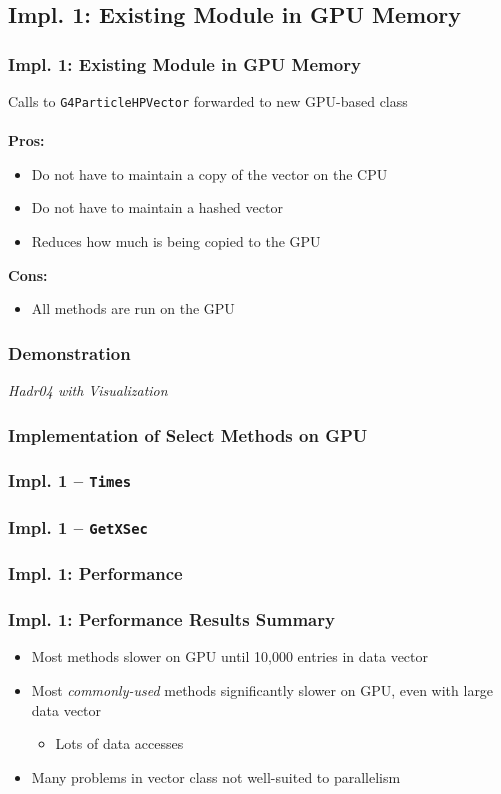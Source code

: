 \documentclass{beamer}
\newcommand{\textapprox}{\raisebox{0.5ex}{\texttildelow}}
\newcommand\pro{\item[$+$]}
\newcommand\con{\item[$-$]}
\begin{document}
\subsection{Impl. 1: Existing Module in GPU Memory}
\begin{frame}
\frametitle{Impl. 1: Existing Module in GPU Memory}
Calls to \texttt{G4ParticleHPVector} forwarded to new GPU-based class\\~\\ %

\textbf{Pros:}
\begin{itemize}
\pro Do not have to maintain a copy of the vector on the CPU
\pro Do not have to maintain a hashed vector
\pro Reduces how much is being copied to the GPU
\end{itemize}
\textbf{Cons:}
\begin{itemize}
\con All methods are run on the GPU
\end{itemize}
\end{frame}

\begin{frame}
\frametitle{Demonstration}
\begin{center}
\emph{Hadr04 with Visualization}
\end{center}
\end{frame}

\subsubsection{Implementation of Select Methods on GPU}
\begin{frame}
\frametitle{Impl. 1 -- \texttt{Times}}
\end{frame}

\begin{frame}
\frametitle{Impl. 1 -- \texttt{GetXSec}}
\end{frame}

\subsubsection{Impl. 1: Performance}
\begin{frame}
\frametitle{Impl. 1: Performance Results Summary}
\begin{itemize}
\item Most methods slower on GPU until \textapprox 10,000 entries in data vector
\item Most \emph{commonly-used} methods significantly slower on GPU, even with large data vector
\begin{itemize}
\item Lots of data accesses
\end{itemize}
\item Many problems in vector class not well-suited to parallelism
\end{itemize}
\end{frame}
\end{document}
